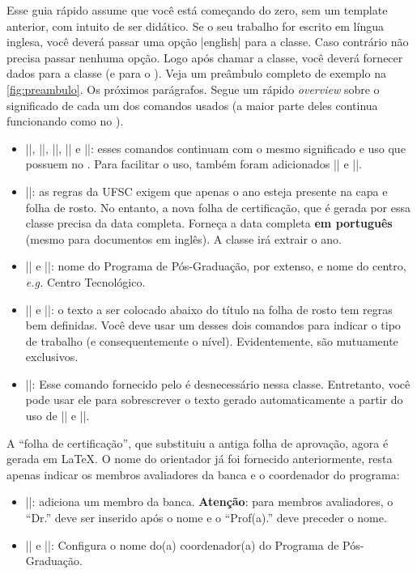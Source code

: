 \documentclass[embeddedlogo]{../ufsc-thesis-rn46-2019}
\begin{document}
Esse guia rápido assume que você está começando do zero, sem um template
anterior, com intuito de ser didático. Se o seu trabalho for escrito em língua
inglesa, você deverá passar uma opção \mt|english| para a classe. Caso contrário
não precisa passar nenhuma opção. Logo após chamar a classe, você deverá
fornecer dados para a classe (e para o \abnTeX). Veja um preâmbulo completo de
exemplo na \autoref{fig:preambulo}. Os próximos parágrafos. Segue um rápido
\emph{overview} sobre o significado de cada um dos comandos usados (a maior
parte deles continua funcionando como no \abnTeX).

\begin{itemize}
  \item \mt|\titulode|, \mt|\autor|, \mt|\instituicao|, \mt|\orientador| e
      \mt|\coorientador|: esses comandos continuam com o mesmo significado e
        uso que possuem no \abnTeX. Para facilitar o uso, também foram
        adicionados \mt|\orientadora| e \mt|\coorientadora|.
  \item \mt|\data|: as regras da UFSC exigem que apenas o ano esteja presente
      na capa e folha de rosto. No entanto, a nova folha de certificação, que é
        gerada por essa classe precisa da data completa. Forneça a data
        completa \textbf{em português} (mesmo para documentos em inglês). A
        classe irá extrair o ano.
  \item \mt|\programa| e \mt|\centro|: nome do Programa de Pós-Graduação, por
      extenso, e nome do centro, \emph{e.g.} Centro Tecnológico.
  \item \mt|\tese| e \mt|\dissertacao|: o texto a ser colocado abaixo do título
      na folha de rosto tem regras bem definidas. Você deve usar um desses dois
        comandos para indicar o tipo de trabalho (e consequentemente o nível).
        Evidentemente, são mutuamente exclusivos.
  \item \mt|\preambulo|: Esse comando fornecido pelo \abnTeX{} é desnecessário
      nessa classe. Entretanto, você pode usar ele para sobrescrever o texto
        gerado automaticamente a partir do uso de \mt|\tese| e \mt|\titulode|.
\end{itemize}

A ``folha de certificação'', que substituiu a antiga folha de aprovação, agora
é gerada em \LaTeX. O nome do orientador já foi fornecido anteriormente, resta
apenas indicar os membros avaliadores da banca e o coordenador do programa:
\begin{itemize}
  \item \mt||: adiciona um membro da banca.
      \textbf{Atenção}: para membros avaliadores, o ``Dr.'' deve ser inserido
        após o nome e o ``Prof(a).'' deve preceder o nome.
  \item \mt|\coordenador| e \mt|\coordenadora|: Configura o nome do(a)
      coordenador(a) do Programa de Pós-Graduação.
\end{itemize}
\end{document}
